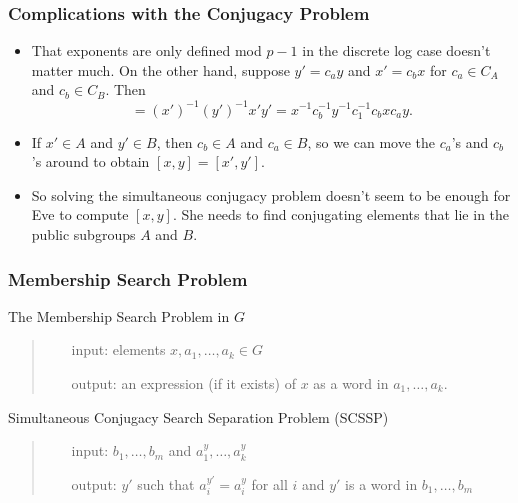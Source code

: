 \documentclass{beamer}
\begin{document}
\begin{frame}
	\frametitle{Complications with the Conjugacy Problem}
	\begin{itemize}
		\item That exponents are only defined mod $p-1$ in the discrete log case doesn't matter much. On the other hand, suppose $y' = c_ay$ and $x' = c_bx$ for $c_a\in C_A$ and $c_b\in C_B$. Then\pause
		\begin{equation*}
			[x',y'] = (x')^{-1}(y')^{-1}x'y' = x^{-1}c_b^{-1}y^{-1}c_1^{-1}c_bxc_ay.
		\end{equation*}\pause
		\item If $x'\in A$ and $y'\in B$, then $c_b\in A$ and $c_a\in B$, so we can move the $c_a$'s and $c_b$'s around to obtain $[x,y] = [x', y']$.\pause
		\item So solving the simultaneous conjugacy problem doesn't seem to be enough for Eve to compute $[x,y]$. She needs to find conjugating elements that lie in the public subgroups $A$ and $B$.
	\end{itemize}
\end{frame}

\begin{frame}
	\frametitle{Membership Search Problem}
	\begin{block}{The Membership Search Problem in $G$}
		\begin{quote}
			\begin{itemize}
				\item[input: ]elements $x, a_1, \ldots, a_k\in G$\pause
				\item[output: ]an expression (if it exists) of $x$ as a word in $a_1, \ldots, a_k$.
			\end{itemize}
		\end{quote}
	\end{block}\pause

	\begin{block}{Simultaneous Conjugacy Search Separation Problem (SCSSP)}
		\begin{quote}
			\begin{itemize}
				\item[input: ]$b_1, \ldots, b_m$ and $a_1^y, \ldots, a_k^y$\pause
				\item[output: ]$y'$ such that $a_i^{y'} = a_i^y$ for all $i$ and $y'$ is a word in $b_1, \ldots, b_m$
			\end{itemize}
		\end{quote}
	\end{block}
\end{frame}
\end{document}
